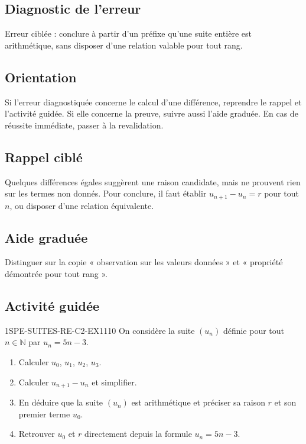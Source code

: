 

\subsection*{Diagnostic de l'erreur}
Erreur ciblée : conclure à partir d'un préfixe qu'une suite entière est
arithmétique, sans disposer d'une relation valable pour tout rang.

\subsection*{Orientation}
Si l'erreur diagnostiquée concerne le calcul d'une différence, reprendre le
rappel et l'activité guidée. Si elle concerne la preuve, suivre aussi l'aide
graduée. En cas de réussite immédiate, passer à la revalidation.

\subsection*{Rappel ciblé}
Quelques différences égales suggèrent une raison candidate, mais ne prouvent
rien sur les termes non donnés. Pour conclure, il faut établir
$u_{n+1}-u_n=r$ pour tout $n$, ou disposer d'une relation équivalente.

\subsection*{Aide graduée}
Distinguer sur la copie « observation sur les valeurs données » et
« propriété démontrée pour tout rang ».

\subsection*{Activité guidée}


\begin{exercice}{1SPE-SUITES-RE-C2-EX1}{1}{10}
On considère la suite $(u_n)$ définie pour tout $n \in \mathbb{N}$ par $u_n = 5n - 3$.
\begin{enumerate}
  \item Calculer $u_0$, $u_1$, $u_2$, $u_3$.
  \item Calculer $u_{n+1} - u_n$ et simplifier.
  \item En déduire que la suite $(u_n)$ est arithmétique et préciser sa raison $r$ et son premier terme $u_0$.
  \item Retrouver $u_0$ et $r$ directement depuis la formule $u_n = 5n - 3$.
\end{enumerate}
\end{exercice}

